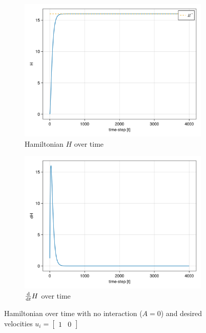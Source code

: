 \begin{itemize}
\begin{figure}[H]
    \centering
    \begin{subfigure}{.49\textwidth}
        \centering
        \includegraphics[width=\linewidth]{figures/ch5_basic/H_nointeraction.png}
        \caption{Hamiltonian $H$ over time}
        \label{plot:nointeraction_h}
    \end{subfigure}
    \begin{subfigure}{.49\textwidth}
        \centering
        \includegraphics[width=\linewidth]{figures/ch5_basic/dH_nointeraction.png}
        \caption{$\frac{\mathrm d}{\mathrm d t} H$ over time}
        \label{plot:nointeraction_dh}
    \end{subfigure}
    \caption{Hamiltonian over time with no interaction ($ A = 0 $) and desired velocities $u_i = \begin{bmatrix}1 & 0\end{bmatrix} $}
    \label{plot:nointeraction_hamiltonian}
\end{figure}


\end{itemize}
